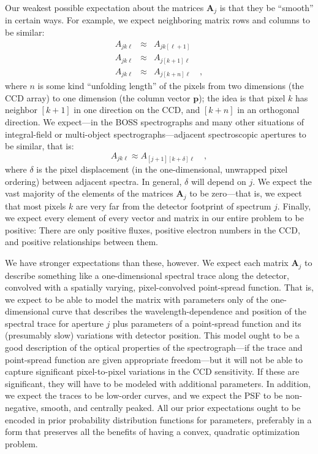\documentclass[12pt]{article}
\newcommand{\hmatrix}[1]{\boldsymbol{#1}}
\newcommand{\Amatrix}{\hmatrix{A}}
\newcommand{\pixels}{\hmatrix{p}}
\begin{document}
Our weakest possible expectation about the matrices $\Amatrix_j$ is
that they be ``smooth'' in certain ways.  For example, we expect
neighboring matrix rows and columns to be similar:
\begin{eqnarray}\displaystyle
A_{jk\ell} & \approx & A_{jk[\ell+1]} \\
A_{jk\ell} & \approx & A_{j[k+1]\ell} \\
A_{jk\ell} & \approx & A_{j[k+n]\ell} \quad ,
\end{eqnarray}
where $n$ is some kind ``unfolding length'' of the pixels from
two dimensions (the CCD array) to one dimension (the column vector
$\pixels$); the idea is that pixel $k$ has neighbor $[k+1]$ in one
direction on the CCD, and $[k+n]$ in an orthogonal direction.  We
expect---in the BOSS spectrographs and many other situations of
integral-field or multi-object spectrographs---adjacent spectroscopic
apertures to be similar, that is:
\begin{equation}
A_{jk\ell} \approx A_{[j+1][k+\delta]\ell} \quad ,
\end{equation}
where $\delta$ is the pixel displacement (in the one-dimensional,
unwrapped pixel ordering) between adjacent spectra.  In general,
$\delta$ will depend on $j$.  We expect the vast majority of the
elements of the matrices $\Amatrix_j$ to be zero---that is, we expect
that most pixels $k$ are very far from the detector footprint of
spectrum $j$.  Finally, we expect every element of every vector and
matrix in our entire problem to be positive: There are only positive
fluxes, positive electron numbers in the CCD, and positive
relationships between them.

We have stronger expectations than these, however.  We expect each
matrix $\Amatrix_j$ to describe something like a one-dimensional
spectral trace along the detector, convolved with a spatially varying,
pixel-convolved point-spread function.  That is, we expect to be able
to model the matrix with parameters only of the one-dimensional curve
that describes the wavelength-dependence and position of the spectral
trace for aperture $j$ plus parameters of a point-spread function and
its (presumably slow) variations with detector position.  This model
ought to be a good description of the optical properties of the
spectrograph---if the trace and point-spread function are given
appropriate freedom---but it will not be able to capture significant
pixel-to-pixel variations in the CCD sensitivity.  If these are
significant, they will have to be modeled with additional parameters.
In addition, we expect the traces to be low-order curves, and we
expect the PSF to be non-negative, smooth, and centrally peaked.  All
our prior expectations ought to be encoded in prior probability
distribution functions for parameters, preferably in a form that
preserves all the benefits of having a convex, quadratic optimization
problem.
\end{document}
